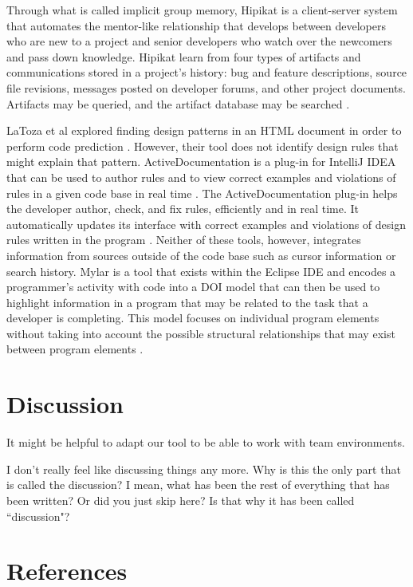 \documentclass[12pt]{article}
\begin{document}
Through what is called implicit group memory, Hipikat is a client-server system that automates the mentor-like relationship that develops between developers who are new to a project and senior developers who watch over the newcomers and pass down knowledge. Hipikat learn from four types of artifacts and communications stored in a project's history: bug and feature descriptions, source file revisions, messages posted on developer forums, and other project documents. Artifacts may be queried, and the artifact database may be searched \cite{CubranicAndMurphy2003}.

LaToza et al explored finding design patterns in an HTML document in order to perform code prediction \cite{LaTozaEtAl2019}. However, their tool does not identify design rules that might explain that pattern. 
ActiveDocumentation is a plug-in for IntelliJ IDEA that can be used to author rules and to view correct examples and violations of rules in a given code base in real time \cite{MehrpurEtAl2019}. The ActiveDocumentation plug-in helps the developer author, check, and fix rules, efficiently and in real time. It automatically updates its interface with correct examples and violations of design rules written in the program \cite{MehrpurEtAl2019}. Neither of these tools, however, integrates information from sources outside of the code base such as cursor information or search history. Mylar is a tool that exists within the Eclipse IDE and encodes a programmer's activity with code into a DOI model that can then be used to highlight information in a program that may be related to the task that a developer is completing. This model focuses on individual program elements without taking into account the possible structural relationships that may exist between program elements \cite{KerstenEtAl2005}.


\clearpage

\section{Discussion}\label{disc}

It might be helpful to adapt our tool to be able to work with team environments. 

I don't really feel like discussing things any more. Why is this the only part that is called the discussion? I mean, what has been the rest of everything that has been written? Or did you just skip here? Is that why it has been called ``discussion"?

\clearpage

\section{References}\label{references}

\printbibliography
\end{document}
